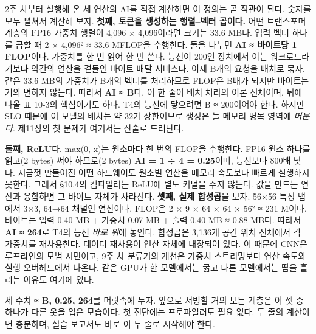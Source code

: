 2주 차부터 실행해 온 세 연산의 AI를 직접 계산하면 이 정의는 곧 직관이 된다. 숫자를 모두 펼쳐서 계산해 보자. \textbf{첫째, 토큰을 생성하는 행렬–벡터 곱이다.} 어떤 트랜스포머 계층의 FP16 가중치 행렬이 4,096 × 4,096이라면 크기는 33.6 MB다. 입력 벡터 하나를 곱할 때 2 × 4,096² ≈ 33.6 MFLOP을 수행한다. 둘을 나누면 \textbf{AI ≈ 바이트당 1 FLOP}이다. 가중치를 한 번 읽어 한 번 쓴다. 능선이 200인 장치에서 이는 워크로드라기보다 약간의 연산을 곁들인 바이트 배달 서비스다. 이제 B개의 요청을 배치로 묶자. 같은 33.6 MB의 가중치가 B개의 벡터를 처리하므로 FLOP은 B배가 되지만 바이트는 거의 변하지 않는다. 따라서 \textbf{AI ≈ B}다. 이 한 줄이 배치 처리의 이론 전체이며, 뒤에 나올 표 10-3의 핵심이기도 하다. T4의 능선에 닿으려면 B ≈ 200이어야 한다. 하지만 SLO 때문에 이 모델의 배치는 약 32가 상한이므로 생성은 늘 메모리 병목 영역에 \textit{머문다}. 제11장의 첫 문제가 여기서는 산술로 드러난다.

\textbf{둘째, ReLU}다. max(0, x)는 원소마다 한 번의 FLOP을 수행한다. FP16 원소 하나를 읽고(2 bytes) 써야 하므로(2 bytes) \textbf{AI = 1 ÷ 4 = 0.25}이며, 능선보다 800배 낮다. 지금껏 만들어진 어떤 하드웨어도 원소별 연산을 메모리 속도보다 빠르게 실행하지 못한다. 그래서 §10.4의 컴파일러는 ReLU에 별도 커널을 주지 않는다. 값을 만드는 연산과 융합하면 그 바이트 자체가 사라진다. \textbf{셋째, 실제 합성곱}을 보자. 56×56 특징 맵에서 3×3, 64→64 채널인 연산이다. FLOP은 2 × 9 × 64 × 64 × 56² ≈ 231 M이다. 바이트는 입력 0.40 MB + 가중치 0.07 MB + 출력 0.40 MB ≈ 0.88 MB다. 따라서 \textbf{AI ≈ 264}로 T4의 능선 \textit{바로 위}에 놓인다. 합성곱은 3,136개 공간 위치 전체에서 각 가중치를 재사용한다. 데이터 재사용이 연산 자체에 내장되어 있다. 이 때문에 CNN은 루프라인의 모범 시민이고, 9주 차 분류기의 개선은 가중치 스트리밍보다 연산 속도와 실행 오버헤드에서 나온다. 같은 GPU가 한 모델에서는 굶고 다른 모델에서는 땀을 흘리는 이유도 여기에 있다.

세 수치 \textbf{≈ B, 0.25, 264}를 머릿속에 두자. 앞으로 서빙할 거의 모든 계층은 이 셋 중 하나가 다른 옷을 입은 모습이다. 첫 진단에는 프로파일러도 필요 없다. 두 줄의 계산이면 충분하며, 실습 보고서도 바로 이 두 줄로 시작해야 한다.

